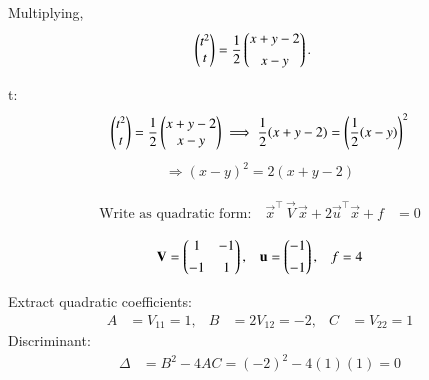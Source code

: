\documentclass[journal,12pt,onecolumn]{IEEEtran}
\begin{document}
Multiplying,
\begin{align}
\begin{pmatrix}t^2\\t\end{pmatrix}
&= 
\frac{1}{2}
\begin{pmatrix}x+y-2\\[4pt]x-y\end{pmatrix}.
\end{align}

 t:
\begin{align}
\begin{pmatrix}t^2\\t\end{pmatrix}
= \frac{1}{2}\begin{pmatrix}x+y-2\\x-y\end{pmatrix}
\implies
\frac{1}{2}(x+y-2)
= \left(\frac{1}{2}(x-y)\right)^2
\end{align}
\begin{align}
\Rightarrow (x-y)^2 = 2(x+y-2)
\end{align}

\begin{align}
\text{Write as quadratic form:}\quad
\vec{x}^\top \, \vec{V}\, \vec{x} + 2\vec{u}^\top\vec{x} + f &= 0
\end{align}

\begin{align}
\mathbf{V} &= \begin{pmatrix}1 & -1\\[4pt]-1 & 1\end{pmatrix}, &
\mathbf{u} &= \begin{pmatrix}-1\\[4pt]-1\end{pmatrix}, &
f = 4
\end{align}

Extract quadratic coefficients:
\begin{align}
A &= V_{11} = 1, & B &= 2V_{12} = -2, & C &= V_{22} = 1
\end{align}
Discriminant:
\begin{align}
\Delta &= B^2 - 4AC = (-2)^2 - 4(1)(1) = 0
\end{align}
\end{document}
